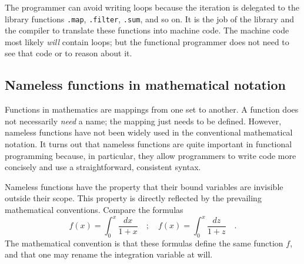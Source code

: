 The programmer can avoid writing loops because the iteration is delegated
to the library functions \lstinline!.map!, \lstinline!.filter!,
\lstinline!.sum!, and so on. It is the job of the library and the
compiler to translate these functions into machine code. The machine
code most likely \emph{will} contain loops; but the functional programmer
does not need to see that code or to reason about it.

\subsection{Nameless functions in mathematical notation\label{subsec:Nameless-functions-in-mathematical-notation}}

Functions in mathematics are mappings from one set to another. A function
does not necessarily \emph{need} a name; the mapping just needs to
be defined. However, nameless functions have not been widely used
in the conventional mathematical notation. It turns out that nameless
functions are quite important in functional programming because, in
particular, they allow programmers to write code more concisely and
use a straightforward, consistent syntax.

Nameless functions have the property that their bound variables are
invisible outside their scope. This property is directly reflected
by the prevailing mathematical conventions. Compare the formulas
\[
f\left(x\right)=\int_{0}^{x}\frac{dx}{1+x}\quad;\quad f\left(x\right)=\int_{0}^{x}\frac{dz}{1+z}\quad.
\]
The mathematical convention is that these formulas define the same
function $f$, and that one may rename the integration variable at
will.

